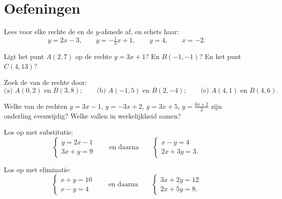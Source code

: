 \section{Oefeningen}

\begin{exercise}[$\star$]\label{exo:g10:lines:1}
Lees voor elke rechte de  en de $y$-afsnede af, en schets
haar:
\[
y = 2x - 3, \qquad
y = -\tfrac13 x + 1, \qquad
y = 4, \qquad
x = -2 .
\]
\end{exercise}

\begin{exercise}[$\star$]\label{exo:g10:lines:2}
Ligt het punt $A(2, 7)$ op de rechte $y = 3x + 1$? En $B(-1, -1)$? En het
punt $C(4, 13)$?
\end{exercise}

\begin{exercise}[$\star$]\label{exo:g10:lines:3}
Zoek de  van de rechte door:
\[
\text{(a) } A(0, 2) \text{ en } B(3, 8);
\qquad
\text{(b) } A(-1, 5) \text{ en } B(2, -4);
\qquad
\text{(c) } A(4, 1) \text{ en } B(4, 6).
\]
\end{exercise}

\begin{exercise}[$\star$]\label{exo:g10:lines:4}
Welke van de rechten $y = 3x - 1$, $y = -3x + 2$, $y = 3x + 5$,
$y = \frac{6x + 2}{2}$ zijn onderling evenwijdig? Welke vallen in
werkelijkheid samen?
\end{exercise}

\begin{exercise}[$\star$]\label{exo:g10:lines:5}
Los op met substitutie:
\[
\begin{cases}
y = 2x - 1 \\
3x + y = 9
\end{cases}
\qquad\text{en daarna}\qquad
\begin{cases}
x - y = 4 \\
2x + 3y = 3 .
\end{cases}
\]
\end{exercise}

\begin{exercise}[$\star$]\label{exo:g10:lines:6}
Los op met eliminatie:
\[
\begin{cases}
x + y = 10 \\
x - y = 4
\end{cases}
\qquad\text{en daarna}\qquad
\begin{cases}
3x + 2y = 12 \\
2x + 5y = 8 .
\end{cases}
\]
\end{exercise}

